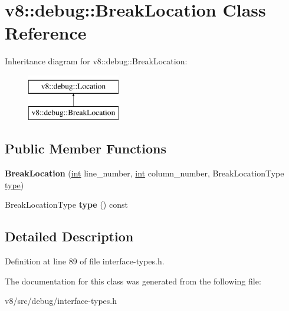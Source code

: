 \hypertarget{classv8_1_1debug_1_1BreakLocation}{}\section{v8\+:\+:debug\+:\+:Break\+Location Class Reference}
\label{classv8_1_1debug_1_1BreakLocation}
Inheritance diagram for v8\+:\+:debug\+:\+:Break\+Location\+:\begin{figure}[H]
\begin{center}
\leavevmode
\includegraphics[height=2.000000cm]{classv8_1_1debug_1_1BreakLocation}
\end{center}
\end{figure}
\subsection*{Public Member Functions}
\begin{DoxyCompactItemize}
\item 
\mbox{\label{classv8_1_1debug_1_1BreakLocation_a05bc4baf65d39752f2e0188abae9ebef}} 
{\bfseries Break\+Location} (\mbox{\hyperlink{classint}{int}} line\+\_\+number, \mbox{\hyperlink{classint}{int}} column\+\_\+number, Break\+Location\+Type \mbox{\hyperlink{classstd_1_1conditional_1_1type}{type}})
\item 
\mbox{\label{classv8_1_1debug_1_1BreakLocation_a6dd1af4ef77fa5710f5cfe474d0eae5a}} 
Break\+Location\+Type {\bfseries type} () const
\end{DoxyCompactItemize}


\subsection{Detailed Description}


Definition at line 89 of file interface-\/types.\+h.



The documentation for this class was generated from the following file\+:\begin{DoxyCompactItemize}
\item 
v8/src/debug/interface-\/types.\+h\end{DoxyCompactItemize}

